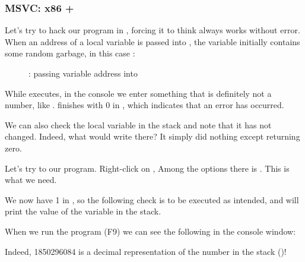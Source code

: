 \clearpage
\subsubsection{MSVC: x86 + \olly}

Let's try to hack our program in \olly, forcing it to think \scanf always works without error.
When an address of a local variable is passed into \scanf,
the variable initially contains some random garbage, in this case :

\begin{figure}[H]
\centering
{}
\caption{\olly: passing variable address into \scanf}
\label{fig:scanf_ex3_olly_1}
\end{figure}

\clearpage
While \scanf executes, in the console we enter something that is definitely not a number, like .
\scanf finishes with 0 in \EAX, which indicates that an error has occurred.

We can also check the local variable in the stack and note that it has not changed.
Indeed, what would \scanf write there?
It simply did nothing except returning zero.

Let's try to  our program.
Right-click on \EAX, 
Among the options there is .
This is what we need.

We now have 1 in \EAX, so the following check is to be executed as intended, 
and \printf will print the value of the variable in the stack.

When we run the program (F9) we can see the following in the console window:



Indeed, 1850296084 is a decimal representation of the number in the stack ()!
